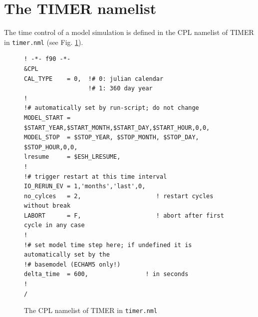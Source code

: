 \documentclass[twoside]{article}
\begin{document}
\section{The TIMER namelist}
\label{sec:namelist}
The time control of a model simulation is defined in the CPL namelist of TIMER
in \verb|timer.nml| (see Fig. \ref{nml}).
%
\begin{figure}
\small
\begin{verbatim}
! -*- f90 -*-
&CPL
CAL_TYPE    = 0,  !# 0: julian calendar
                  !# 1: 360 day year
!
!# automatically set by run-script; do not change
MODEL_START = $START_YEAR,$START_MONTH,$START_DAY,$START_HOUR,0,0,
MODEL_STOP  = $STOP_YEAR, $STOP_MONTH, $STOP_DAY, $STOP_HOUR,0,0,
lresume     = $ESH_LRESUME,
!
!# trigger restart at this time interval
IO_RERUN_EV = 1,'months','last',0,
no_cylces   = 2,                     ! restart cycles without break
LABORT      = F,                     ! abort after first cycle in any case
! 
!# set model time step here; if undefined it is automatically set by the
!# basemodel (ECHAM5 only!)
delta_time  = 600,                ! in seconds
!
/

\end{verbatim}
\caption{The CPL namelist of TIMER in \tt{timer.nml} \label{nml}}
\end{figure}
%
\end{document}
